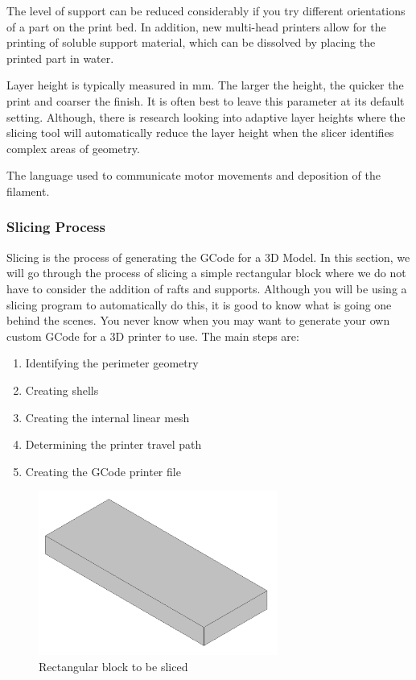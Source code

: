 The level of support can be reduced considerably if you try different orientations of a part on the print bed. In addition, new multi-head printers allow for the printing of soluble support material, which can be dissolved by placing the printed part in water.

Layer height is typically measured in \si{\milli\metre}. The larger the height, the quicker the print and coarser the finish. It is often best to leave this parameter at its default setting. Although, there is research looking into adaptive layer heights where the slicing tool will automatically reduce the layer height when the slicer identifies complex areas of geometry.\cite[-6em]{pandey2003}\cite[-1em]{sabourin1996}

The language used to communicate motor movements and deposition of the filament.


\subsubsection{Slicing Process} 

Slicing is the process of generating the GCode for a 3D Model. In this section, we will go through the process of slicing a simple rectangular block where we do not have to consider the addition of rafts and supports. Although you will be using a slicing program to automatically do this, it is good to know what is going one behind the scenes. You never know when you may want to generate your own custom GCode for a 3D printer to use. The main steps are:

\begin{enumerate}
    \item Identifying the perimeter geometry
    \item Creating shells
    \item Creating the internal linear mesh
    \item Determining the printer travel path
    \item Creating the GCode printer file
\end{enumerate}

\begin{figure}[h!]
    \centering
    \includegraphics[width=0.7\textwidth]{07_design_for_x/beam_stl.png}
    \caption{Rectangular block to be sliced}\label{fig-block}
\end{figure}



